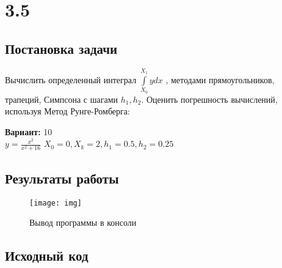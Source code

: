 \section* {3.5}

\subsection{Постановка задачи}
Вычислить определенный интеграл $\int\limits_{X_0}^{X_1} y dx$  , методами прямоугольников, трапеций, Симпсона с шагами $h_1,h_2$. Оценить погрешность вычислений, используя  Метод Рунге-Ромберга: 

{\bfseries Вариант:} 10\\
$y=\frac{x^2}{x^2+16}$
$X_0=0, X_k=2, h_1=0.5, h_2=0.25$

\subsection{Результаты работы}
\begin{figure}[h!]
\centering
\texttt{[image: img]}
\caption{Вывод программы в консоли}
\end{figure}
\pagebreak


\subsection{Исходный код}
% 

% 
% 
% 
